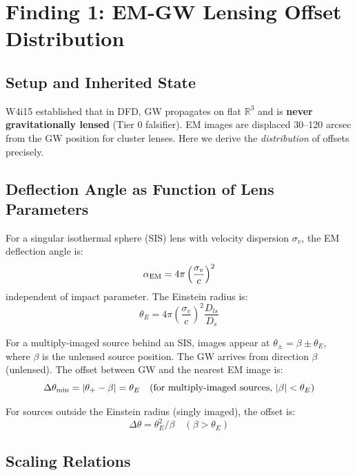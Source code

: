 \documentclass[11pt,a4paper]{article}
\begin{document}
\section{Finding 1: EM-GW Lensing Offset Distribution}
\label{sec:offset-dist}

\subsection{Setup and Inherited State}

W4i15 established that in DFD, GW propagates on flat $\mathbb{R}^3$
and is \textbf{never gravitationally lensed} (Tier 0 falsifier).  EM
images are displaced 30--120 arcsec from the GW position for cluster
lenses.  Here we derive the \emph{distribution} of offsets precisely.

\subsection{Deflection Angle as Function of Lens Parameters}

For a singular isothermal sphere (SIS) lens with velocity dispersion
$\sigma_v$, the EM deflection angle is:
\begin{equation}
\alpha_{\rm EM} = 4\pi\left(\frac{\sigma_v}{c}\right)^2
\end{equation}
independent of impact parameter.  The Einstein radius is:
\begin{equation}
\theta_E = 4\pi\left(\frac{\sigma_v}{c}\right)^2 \frac{D_{ls}}{D_s}
\end{equation}

For a multiply-imaged source behind an SIS, images appear at
$\theta_{\pm} = \beta \pm \theta_E$, where $\beta$ is the unlensed
source position.  The GW arrives from direction $\beta$ (unlensed).
The offset between GW and the nearest EM image is:
\begin{equation}
\Delta\theta_{\rm min} = |\theta_+ - \beta| = \theta_E
\quad \text{(for multiply-imaged sources, } |\beta| < \theta_E\text{)}
\end{equation}

For sources outside the Einstein radius (singly imaged), the offset is:
\begin{equation}
\Delta\theta = \theta_E^2 / \beta \quad (\beta > \theta_E)
\end{equation}

\subsection{Scaling Relations}
\end{document}
